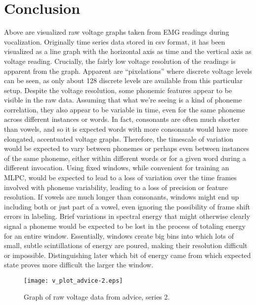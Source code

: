 \documentclass[conference]{IEEEtran}
\begin{document}
\section{Conclusion}
Above are visualized raw voltage graphs taken from EMG readings during vocalization. Originally time series data stored in csv format, it has been visualized as a line graph with the horizontal axis as time and the vertical axis as voltage reading. Crucially, the fairly low voltage resolution of the readings is apparent from the graph. Apparent are “pixelations” where discrete voltage levels can be seen, as only about 128 discrete levels are available from this particular setup. Despite the voltage resolution, some phonemic features appear to be visible in the raw data. Assuming that what we're seeing is a kind of phoneme correlation, they also appear to be variable in time, even for the same phoneme across different instances or words. In fact, consonants are often much shorter than vowels, and so it is expected words with more consonants would have more elongated, accentuated voltage graphs. Therefore, the timescale of variation would be expected to vary between phonemes or perhaps even between instances of the same phoneme, either within different words or for a given word during a different invocation. Using fixed windows, while convenient for training an MLPC, would be expected to lead to a loss of variation over the time frames involved with phoneme variability, leading to a loss of precision or feature resolution. If vowels are much longer than consonants, windows might end up including both or just part of a vowel, even ignoring the possibility of frame shift errors in labeling. Brief variations in spectral energy that might otherwise clearly signal a phoneme would be expected to be lost in the process of totaling energy for an entire window. Essentially, windows create big bins into which lots of small, subtle scintillations of energy are poured, making their resolution difficult or impossible. Distinguishing later which bit of energy came from which expected state proves more difficult the larger the window.

\begin{figure}[!t]
\centering
\texttt{[image: v\_plot\_advice-2.eps]}
\caption{Graph of raw voltage data from advice, series 2.}
\label{fig_v1}
\end{figure}
\end{document}
